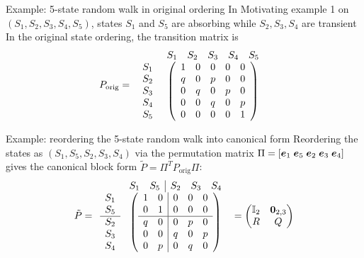 \documentclass[aspectratio=169]{beamer}\usepackage[]{graphicx}\usepackage[]{xcolor}
\begin{document}
\begin{frame}{Example: 5-state random walk in original ordering}
In Motivating example 1 on $(S_1, S_2, S_3, S_4, S_5)$, states $S_1$ and $S_5$ are absorbing while $S_2, S_3, S_4$ are transient
\vfill
In the original state ordering, the transition matrix is
\[
P_{\text{orig}} = \begin{array}{c@{\hspace{4pt}}c}
& \begin{array}{ccccc} S_1 & S_2 & S_3 & S_4 & S_5 \end{array} \\
\begin{array}{c} S_1 \\ S_2 \\ S_3 \\ S_4 \\ S_5 \end{array} &
\left(\begin{array}{ccccc}
1 & 0 & 0 & 0 & 0 \\
q & 0 & p & 0 & 0 \\
0 & q & 0 & p & 0 \\
0 & 0 & q & 0 & p \\
0 & 0 & 0 & 0 & 1
\end{array}\right)
\end{array}
\]
\end{frame}

\begin{frame}{Example: reordering the 5-state random walk into canonical form}
Reordering the states as $(S_1, S_5, S_2, S_3, S_4)$ via the permutation matrix $\Pi = [\bm{e}_1\; \bm{e}_5\; \bm{e}_2\; \bm{e}_3\; \bm{e}_4]$ gives the canonical block form $\tilde{P} = \Pi^T P_{\text{orig}} \Pi$:
\vfill
\[
\tilde{P} = \begin{array}{c@{\hspace{4pt}}c}
& \begin{array}{cc|ccc} S_1 & S_5 & S_2 & S_3 & S_4 \end{array} \\
\begin{array}{c} S_1 \\ S_5 \\ \hline S_2 \\ S_3 \\ S_4 \end{array} &
\left(\begin{array}{cc|ccc}
1 & 0 & 0 & 0 & 0 \\
0 & 1 & 0 & 0 & 0 \\ \hline
q & 0 & 0 & p & 0 \\
0 & 0 & q & 0 & p \\
0 & p & 0 & q & 0
\end{array}\right)
\end{array} = \begin{pmatrix} \II_2 & \b0_{2,3} \\ R & Q \end{pmatrix}
\]
\end{frame}
\end{document}
